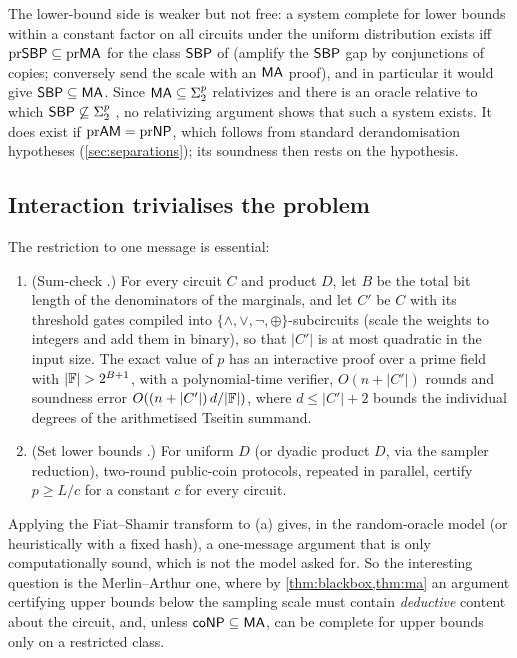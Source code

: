 The lower-bound side is weaker but not free: a system complete for lower
bounds within a constant factor on all circuits under the uniform distribution
exists iff
$\mathrm{pr}\mathsf{SBP}\subseteq\mathrm{pr}\mathsf{MA}$ for the class $\mathsf{SBP}$ of \cite{bgm2006}
(amplify the $\mathsf{SBP}$ gap by conjunctions of copies; conversely send the scale with
an $\mathsf{MA}$ proof), and in particular it would give $\mathsf{SBP}\subseteq\mathsf{MA}$. Since
$\mathsf{MA}\subseteq\Sigma_2^p$ relativizes and there is an oracle relative to which
$\mathsf{SBP}\not\subseteq\Sigma_2^p$ \cite{bgm2006}, no relativizing argument shows that
such a system exists. It does exist if $\mathrm{pr}\mathsf{AM}=\mathrm{pr}\mathsf{NP}$, which
follows from standard derandomisation hypotheses (\cref{sec:separations}); its
soundness then rests on the hypothesis.

\subsection{Interaction trivialises the problem}

The restriction to one message is essential:

\begin{proposition}\label{prop:interactive}
\begin{enumerate}[label=(\alph*)]
\item (Sum-check \cite{lfkn1992}.) For every circuit $C$ and product $D$, let $B$ be
the total bit length of the denominators of the marginals, and let $C'$ be $C$ with
its threshold gates compiled into $\{\wedge,\vee,\neg,\oplus\}$-subcircuits (scale the
weights to integers and add them in binary), so that $|C'|$ is at most quadratic in
the input size. The exact value of $p$ has an interactive proof over a prime field
with $|\F|>2^{B+1}$, with a polynomial-time verifier, $O(n+|C'|)$ rounds and
soundness error $O((n+|C'|)\,d/|\mathbb{F}|)$, where $d\le|C'|+2$ bounds the individual
degrees of the arithmetised Tseitin summand.
\item (Set lower bounds \cite{gs1986}.) For uniform $D$ (or dyadic product $D$, via
the sampler reduction), two-round public-coin protocols, repeated in parallel,
certify $p\ge L/c$ for a constant $c$ for every circuit.
\end{enumerate}
\end{proposition}

Applying the Fiat--Shamir transform to (a) gives, in the random-oracle model
(or heuristically with a fixed hash), a one-message argument that is only
computationally sound, which is not the model asked for. So the interesting
question is the Merlin--Arthur one, where by \cref{thm:blackbox,thm:ma} an
argument certifying upper bounds below the sampling scale must contain
\emph{deductive} content about the circuit, and, unless $\mathsf{coNP}\subseteq\mathsf{MA}$, can be
complete for upper bounds only on a restricted class.
